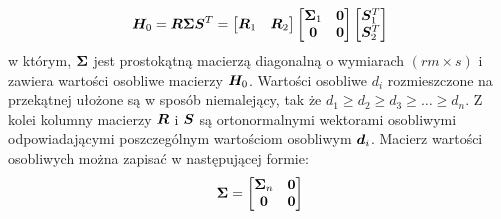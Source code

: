 \begin{equation} \label{eq: SVDHzero}
	\bm{H}_0 = \bm{R}\bm{\Sigma} \bm{S}^T = \begin{bmatrix}
		\bm{R}_1 & \bm{R}_2
	\end{bmatrix}\begin{bmatrix}
		\bm{\Sigma}_1 & \bm{0} \\
		\bm{0} & \bm{0} 
	\end{bmatrix}\begin{bmatrix}
		\bm{S}_1^T \\
		\bm{S}_2^T 
	\end{bmatrix}
\end{equation}
w którym, $\bm{\Sigma}$ jest prostokątną macierzą diagonalną o wymiarach $(rm\times s)$ i zawiera wartości osobliwe macierzy $\bm{H}_0$. Wartości osobliwe $d_i$ rozmieszczone na przekątnej ułożone są w sposób niemalejący, tak że $d_1\ge d_2\ge d_3\ge\dots\ge d_n$. Z kolei kolumny macierzy $\bm{R}$ i $\bm{S}$ są ortonormalnymi wektorami osobliwymi odpowiadającymi poszczególnym wartościom osobliwym $\bm{d}_i$. Macierz wartości osobliwych można zapisać w następującej formie:
\begin{equation}
	\bm{\Sigma} = \begin{bmatrix}
		\bm{\Sigma}_n & \bm{0} \\
		\bm{0} & \bm{0}
	\end{bmatrix}
\end{equation}

